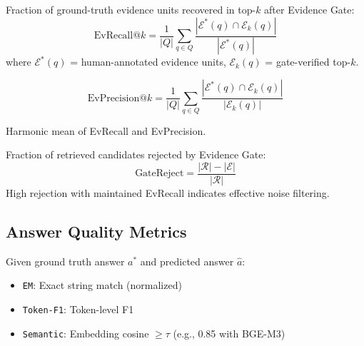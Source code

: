 \begin{definition}
\label{def:evidence-recall}
Fraction of ground-truth evidence units recovered in top-$k$ after Evidence Gate:
\begin{equation}
\text{EvRecall}@k = \frac{1}{|Q|} \sum_{q \in Q} \frac{|\mathcal{E}^*(q) \cap \mathcal{E}_k(q)|}{|\mathcal{E}^*(q)|}
\end{equation}
where $\mathcal{E}^*(q)$ = human-annotated evidence units, $\mathcal{E}_k(q)$ = gate-verified top-$k$.
\end{definition}

\begin{definition}
\label{def:evidence-precision}
\begin{equation}
\text{EvPrecision}@k = \frac{1}{|Q|} \sum_{q \in Q} \frac{|\mathcal{E}^*(q) \cap \mathcal{E}_k(q)|}{|\mathcal{E}_k(q)|}
\end{equation}
\end{definition}

\begin{definition}[Evidence F1@k]
\label{def:evidence-f1}
Harmonic mean of EvRecall and EvPrecision.
\end{definition}

\begin{definition}
\label{def:gate-rejection}
Fraction of retrieved candidates rejected by Evidence Gate:
\begin{equation}
\text{GateReject} = \frac{|\mathcal{R}| - |\mathcal{E}|}{|\mathcal{R}|}
\end{equation}
High rejection with maintained EvRecall indicates effective noise filtering.
\end{definition}

\subsection{Answer Quality Metrics}
\label{sec:eval:answer-metrics}

\begin{definition}
\label{def:ans-correct}
Given ground truth answer $a^*$ and predicted answer $\hat{a}$:
\begin{itemize}
  \item \texttt{EM}: Exact string match (normalized)
  \item \texttt{Token-F1}: Token-level F1
  \item \texttt{Semantic}: Embedding cosine $\geq \tau$ (e.g., 0.85 with BGE-M3)
\end{itemize}
\end{definition}

